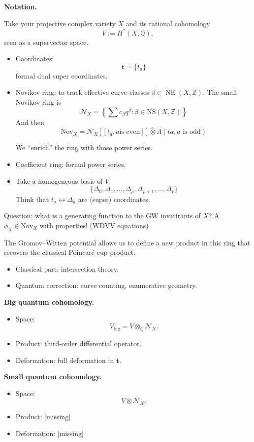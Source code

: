 \medskip\noindent
{\bf Notation.}

Take your projective complex variety  $X$
and its rational
cohomology
$$
V:=H^*(X,\mathbb{Q}),
$$
seen as a supervector space.
\begin{itemize}
\item Coordinates:
$$
\mathbf{t}=\{t_a\}
$$
formal dual super coordinates.
\item Novikov ring:
to track effective curve classes
$\beta \in \overline{\operatorname{NE}}
(X,\mathbb{Z})$.
The small Novikov ring is
$$
\mathcal{N}_X
=\left\{\sum c_\beta q ^\beta:\beta
\in \overline{\text{NS}}(X,\mathbb{Z})
\right\}
$$
\noindent
And then
$$
\text{Nov}_X
=\mathcal{N}_X [[t_a,a \text{is even}]]
\hat{\otimes}\Lambda(ta,a\text{ is odd})
$$

We ``enrich'' the ring with those
power series.
\item Coefficient ring:
formal power series.
\item Take a homogeneous basis of $V$:
$$
\{\Delta_0,\Delta_1,…
,\Delta_\rho,\Delta_{\rho+1},…
,\Delta_r\}
$$
Think that
$t_a \leftrightarrow \Delta_a$
are (super) coordinates.
\end{itemize}
\noindent
Question: what is a generating function
to the GW invarirants of $X$?
A $\phi_X \in \text{Nov}_X$
with properties! (WDVV equations)

The Gromov--Witten potential allows
us to define a new product in this
ring that recovers the classical
Poincar\'e cup product.
\begin{itemize}
\item Classical part:
intersection theory.
\item Quantum correction:
curve counting, enumerative
geometry.
\end{itemize}

\medskip\noindent
{\bf Big quantum cohomology.}

\begin{itemize}
\item Space:
$$
V_{\mathrm{big}}=
V\otimes_{\mathbb{Q}}\mathcal{N}_X.
$$
\item Product: third-order
differential operator.
\item Deformation: full deformation
in $\mathbf{t}$.
\end{itemize}

\medskip\noindent
{\bf Small quantum cohomology.}

\begin{itemize}
\item Space:
$$
V\otimes\mathcal{N}_X.
$$
\item Product:
[missing]
\item Deformation:
[missing]
\end{itemize}

